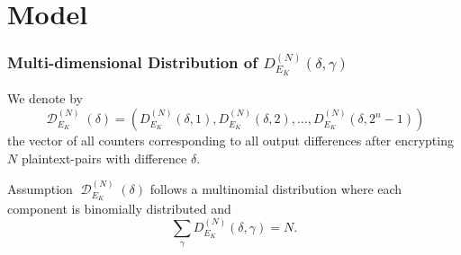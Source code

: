 \documentclass[11pt]{beamer}
\newcommand{\cbox}[3]{\draw[fill=#3] (#1,#2) -- (#1,0) -- (#1+1,0) -- (#1+1,#2) -- cycle;}
\DeclareMathOperator{\D}{\mathcal{D}}
\begin{document}
\section{Model}

\begin{frame}
\frametitle{Multi-dimensional Distribution of $D^{(N)}_{E_K}(\delta,\gamma)$}
We denote by
\[ \D^{(N)}_{E_K}(\delta) = \left(D^{(N)}_{E_K}(\delta,1),D^{(N)}_{E_K}(\delta,2),\dots,D^{(N)}_{E_K}(\delta,2^n-1)\right) \]
the vector of all counters corresponding to all output differences after encrypting $N$ plaintext-pairs with difference $\delta$.

\begin{center}
\end{center}

\framebreak

\begin{block}{Assumption}
$\D^{(N)}_{E_K}(\delta)$ follows a multinomial distribution where each component is binomially distributed and
$$\sum_{\gamma}  D^{(N)}_{E_K}(\delta,\gamma) =N.$$
\end{block}


\end{frame}
\end{document}
